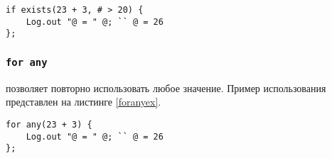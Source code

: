 \begin{lstlisting}[caption=Использование if exist, label=ifexistsex]
if exists(23 + 3, # > 20) {
	Log.out "@ = " @; `` @ = 26
};
\end{lstlisting}

\subsubsection{\lstinline|for any|}

 позволяет повторно использовать любое значение. Пример использования представлен на листинге \ref{foranyex}.

\begin{lstlisting}[caption=Использование for any, label=foranyex]
for any(23 + 3) {
	Log.out "@ = " @; `` @ = 26
};
\end{lstlisting}

